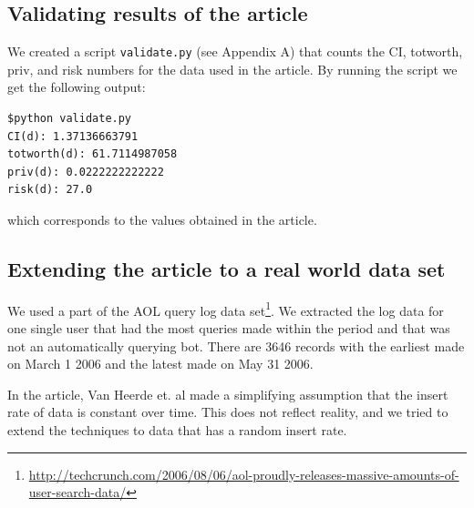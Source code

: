 \documentclass[a4paper,12pt,oneside,fleqn]{article}
\begin{document}



\subsection{Validating results of the article}

We created a script \texttt{validate.py} (see Appendix A) that counts
the CI, totworth, priv, and risk numbers for the data used in the
article. By running the script we get the following output:

\begin{verbatim}
$python validate.py
CI(d): 1.37136663791
totworth(d): 61.7114987058
priv(d): 0.0222222222222
risk(d): 27.0
\end{verbatim}

which corresponds to the values obtained in the article.

\subsection{Extending the article to a real world data set}

We used a part of the AOL query log data
set\footnote{\href{http://techcrunch.com/2006/08/06/aol-proudly-releases-massive-amounts-of-user-search-data/}{http://techcrunch.com/2006/08/06/aol-proudly-releases-massive-amounts-of-user-search-data/}}. We
extracted the log data for one single user that had the most queries
made within the period and that was not an automatically querying
bot. There are 3646 records with the earliest made on March 1 2006 and
the latest made on May 31 2006.

In the article, Van Heerde et. al made a simplifying assumption that
the insert rate of data is constant over time. This does not reflect
reality, and we tried to extend the techniques to data that has a
random insert rate.
\end{document}

